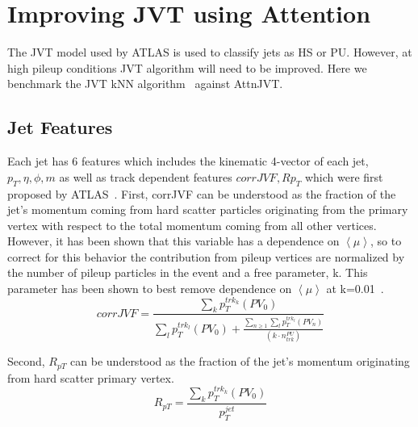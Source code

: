 \section{Improving JVT using Attention}\hfill

The JVT model used by ATLAS is used to classify jets as HS or PU. However, at high pileup conditions JVT algorithm will need to be improved. Here we benchmark the JVT kNN algorithm~\cite{ATLAS-CONF-2014-018} against AttnJVT.
\subsection{Jet Features}\hfill

Each jet has 6 features which includes the kinematic 4-vector of each jet, $p_T, \eta, \phi, m$ as well as track dependent features $corrJVF, Rp_T$ which were first proposed by ATLAS~\cite{ATLAS-CONF-2014-018}. First, corrJVF can be understood as the fraction of the jet's momentum coming from hard scatter particles originating from the primary vertex with respect to the total momentum coming from all other vertices. However, it has been shown that this variable has a dependence on $\left<\mu\right>$, so to correct for this behavior the contribution from pileup vertices are normalized by the number of pileup particles in the event and a free parameter, k. This parameter has been shown to best remove dependence on $\left<\mu\right>$ at k=0.01~\cite{ATLAS-CONF-2014-018}.
\begin{equation}
    corrJVF = \frac{\sum\limits_k p_T^{trk_k}(PV_0)}{\sum\limits_l p_T^{trk_l}(PV_0)+\frac{\sum\limits_{n\geq1}\sum\limits_l p_T^{trk_l}(PV_n)}{(k \cdot n^{PU}_{trk})}}
\end{equation}


Second, $R_{pT}$ can be understood as the fraction of the jet's momentum originating from hard scatter primary vertex.
\begin{equation}
    R_{pT} = \frac{\sum_kp_T^{trk_k}(PV_0)}{p_T^{jet}}
\end{equation}

